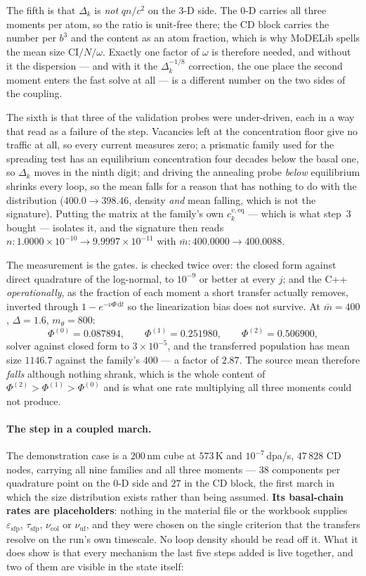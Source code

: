 \documentclass{article}
\begin{document}
The fifth is that $\Delta_k$ is \emph{not} $qn/c^2$ on the $3$-D side. The
$0$-D carries all three moments per atom, so the ratio is unit-free there; the
CD block carries the number per $b^3$ and the content as an atom fraction, which
is why MoDELib spells the mean size $\mathrm{CI}/N/\omega$. Exactly one factor of
$\omega$ is therefore needed, and without it the dispersion --- and with it the
$\Delta_k^{-1/8}$ correction, the one place the second moment enters the fast
solve at all --- is a different number on the two sides of the coupling.

The sixth is that three of the validation probes were under-driven, each in a way
that read as a failure of the step. Vacancies left at the concentration floor
give no traffic at all, so every current measures zero; a prismatic family used
for the spreading test has an equilibrium concentration four decades below the
basal one, so $\Delta_k$ moves in the ninth digit; and driving the annealing
probe \emph{below} equilibrium shrinks every loop, so the mean falls for a reason
that has nothing to do with the distribution ($400.0\to398.46$, density
\emph{and} mean falling, which is not the signature). Putting the matrix at the
family's own $c^{v,\mathrm{eq}}_k$ --- which is what step~3 bought --- isolates
it, and the signature then reads $n:1.0000\times10^{-10}\to9.9997\times10^{-11}$
with $\bar m:400.0000\to400.0088$.

The measurement is the gates.  is checked twice over: the
closed form against direct quadrature of the log-normal, to $10^{-9}$ or better
at every $j$; and the C++ \emph{operationally}, as the fraction of each moment a
short transfer actually removes, inverted through $1-e^{-\nu\Phi\,\mathrm dt}$
so the linearization bias does not survive. At $\bar m=400$, $\Delta=1.6$,
$m_\theta=800$:
\[
  \Phi^{(0)}=0.087894,\qquad \Phi^{(1)}=0.251980,\qquad \Phi^{(2)}=0.506900,
\]
solver against closed form to $3\times10^{-5}$, and the transferred population
has mean size $1146.7$ against the family's $400$ --- a factor of $2.87$. The
source mean therefore \emph{falls} although nothing shrank, which is the whole
content of $\Phi^{(2)}>\Phi^{(1)}>\Phi^{(0)}$ and is what one rate multiplying
all three moments could not produce.

\paragraph{The step in a coupled march.} The demonstration case is a $200$\,nm
cube at $573$\,K and $10^{-7}$\,dpa/s, $47\,828$ CD nodes, carrying all nine
families and all three moments --- $38$ components per quadrature point on the
$0$-D side and $27$ in the CD block, the first march in which the size
distribution exists rather than being assumed. \textbf{Its basal-chain rates are
placeholders}: nothing in the material file or the workbook supplies
$\varepsilon_{\mathrm{sfp}}$, $\tau_{\mathrm{sfp}}$, $\nu_{\mathrm{col}}$ or
$\nu_{\mathrm{uf}}$, and they were chosen on the single criterion that the
transfers resolve on the run's own timescale. No loop density should be read off
it. What it does show is that every mechanism the last five steps added is live
together, and two of them are visible in the state itself:
\end{document}
